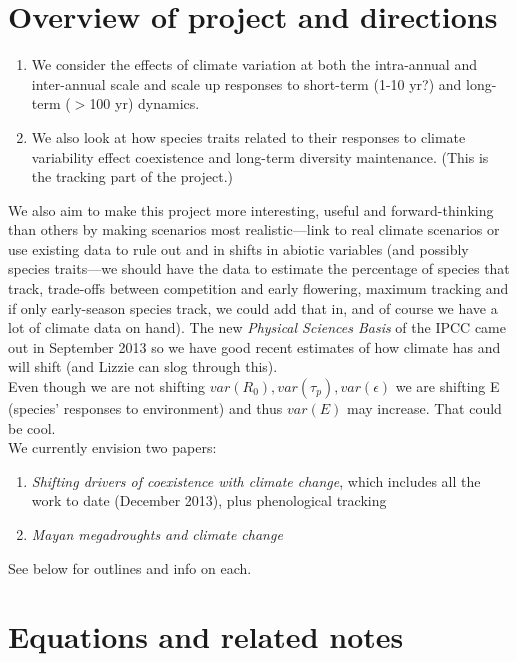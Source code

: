 \documentclass[11pt,a4paper,oneside]{article}
\begin{document}
\section{Overview of project and directions}
\noindent 
\begin{enumerate}
\item We consider the effects of climate variation at both the
intra-annual and inter-annual scale and scale up responses to
short-term (1-10 yr?) and long-term (\(>\)100 yr) dynamics. 
\item We also look at how species traits related to their responses to
  climate variability effect coexistence and long-term diversity
  maintenance. (This is the tracking part of the project.) 
\end{enumerate}

\noindent We also aim to make  this project more
interesting, useful and forward-thinking than others by making
scenarios most realistic---link to real climate scenarios or use
existing data to rule out and in shifts in abiotic variables (and
possibly species traits---we should have the data to estimate the
percentage of species that track, trade-offs between competition and early flowering, maximum tracking and if only
early-season species track, we could add that in, and of course we
have a lot of climate data on hand). The new \emph{Physical Sciences Basis} of the IPCC came out in September 2013 so we have good recent estimates of how climate has and will shift (and Lizzie can slog through this).\\

 Even though we are not shifting \(var(R_{0}), var(\tau_{p}), var(\epsilon)\) we are shifting E (species' responses to environment) and thus \(var(E)\) may increase. That could be cool.\\

 We currently envision two papers: 
\begin{enumerate}
\item \emph{Shifting drivers of coexistence with climate change}, which includes all the work to date (December 2013), plus phenological tracking
\item  \emph{Mayan megadroughts and climate change} 
\end{enumerate}
See below for outlines and info on each.

\newpage
\section{Equations and related notes}
\end{document}

